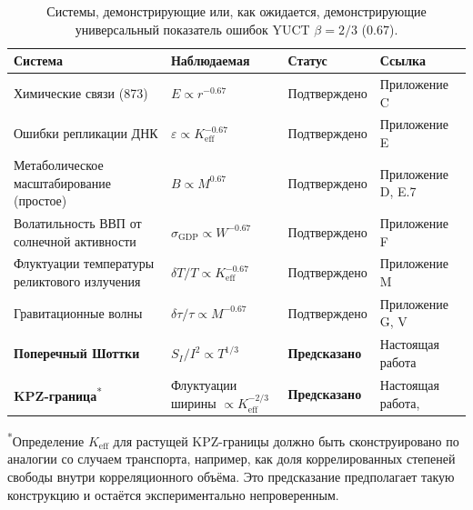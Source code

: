 \documentclass[12pt,a4paper]{article}
\newcommand{\Keff}{K_{\mathrm{eff}}}
\begin{document}
	\begin{table}[H]
		\centering
		\caption{Системы, демонстрирующие или, как ожидается, демонстрирующие
			универсальный показатель ошибок YUCT $\beta = 2/3$ ($0.67$).}
		\label{tab:universal-beta}
		\begin{tabular}{@{}llll@{}}
			\toprule
			\textbf{Система} & \textbf{Наблюдаемая} & \textbf{Статус} & \textbf{Ссылка}\\
			\midrule
			Химические связи (873)      & $E \propto r^{-0.67}$               & Подтверждено  & Приложение C \\
			Ошибки репликации ДНК    & $\varepsilon \propto \Keff^{-0.67}$ & Подтверждено  & Приложение E \\
			Метаболическое масштабирование (простое)& $B \propto M^{0.67}$               & Подтверждено  & Приложение D, E.7 \\
			Волатильность ВВП от солнечной активности & $\sigma_{\mathrm{GDP}} \propto W^{-0.67}$ & Подтверждено & Приложение F \\
			Флуктуации температуры реликтового излучения    & $\delta T/T \propto \Keff^{-0.67}$ & Подтверждено  & Приложение M \\
			Гравитационные волны       & $\delta\tau/\tau \propto M^{-0.67}$& Подтверждено  & Приложение G, V \\
			\textbf{Поперечный Шоттки} & $S_I/I^2 \propto T^{1/3}$          & \textbf{Предсказано} & Настоящая работа \\
			\textbf{KPZ-граница}\textsuperscript{*} & Флуктуации ширины $\propto \Keff^{-2/3}$& \textbf{Предсказано} & Настоящая работа, \cite{KPZ}\\
			\bottomrule
		\end{tabular}
		
		\vspace{0.3cm}
		{\footnotesize \textsuperscript{*}Определение $K_{\mathrm{eff}}$ для растущей KPZ-границы должно быть сконструировано по аналогии со случаем транспорта, например, как доля коррелированных степеней свободы внутри корреляционного объёма. Это предсказание предполагает такую конструкцию и остаётся экспериментально непроверенным.}
	\end{table}
	
\end{document}
